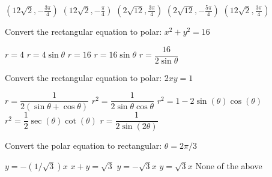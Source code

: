 \documentclass[11pt]{exam}
\begin{document}
\begin{questions}
\begin{minipage}{\linewidth}
\begin{choices}
	\CorrectChoice $\left(12 \sqrt{2},-\frac{3 \pi }{4}\right)$
	\choice $\left(12 \sqrt{2},-\frac{\pi }{4}\right)$
	\choice $\left(2 \sqrt{12},\frac{3 \pi }{4}\right)$
	\choice $\left(2 \sqrt{12},-\frac{5 \pi }{4}\right)$
	\choice $\left(12 \sqrt{2},\frac{3 \pi }{4}\right)$
\end{choices} \answerline

\end{minipage}

\begin{minipage}{\linewidth}



\question Convert the rectangular equation to polar: $x^2 + y^2 = 16$

\begin{choices}
	\CorrectChoice $r = 4$
	\choice $r = 4 \sin \theta$
	\choice $r=16$
	\choice $r = 16 \sin \theta$
	\choice $r = \dfrac{16}{2\sin\theta}$
\end{choices} \answerline
\end{minipage}

\begin{minipage}{\linewidth}



\question Convert the rectangular equation to polar: $2xy=1$

\begin{choices}
	\choice $r = \dfrac{1}{2(\sin\theta + \cos\theta)}$
	\CorrectChoice $r^2 = \dfrac{1}{2\sin\theta\cos\theta}$
	\choice $r^2 = 1 - 2\sin(\theta)\cos(\theta)$
	\choice $r^2 = \dfrac{1}{2}\sec(\theta)\cot(\theta)$
	\choice $r = \dfrac{1}{2\sin(2\theta)}$
\end{choices} \answerline
\end{minipage}

\begin{minipage}{\linewidth}


\question Convert the polar equation to rectangular: $\theta = 2\pi/3$

\begin{choices}
	\choice $y = -(1/\sqrt3) x$
	\choice $x+y = \sqrt3$
	\correctchoice $y = -\sqrt3 x$
	\choice $y = \sqrt3 x$
	\choice None of the above
\end{choices} \answerline


\end{minipage}

\begin{minipage}{\linewidth}



\end{minipage}
\end{questions}
\end{document}

